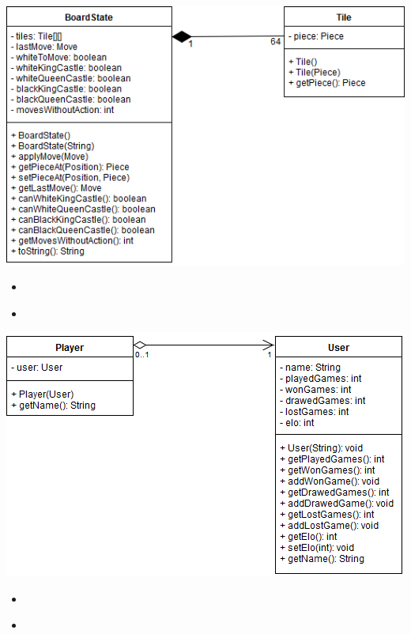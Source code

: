 \documentclass[parskip=full]{scrartcl}
\begin{document}
\begin{minipage}{\linewidth}
			\centering
			\includegraphics[width=1\linewidth]{Diagramme/BoardState}
			\label{fig:boardState}
		\end{minipage}
		\begin{itemize}
			\item
				\begin{description}
				
				\end{description}
			\item
				\begin{description}
				
				\end{description}
		\end{itemize}
		\newpage		
		
\begin{minipage}{\linewidth}
			\centering
			\includegraphics[width=1\linewidth]{Diagramme/Player}
			\label{fig:player}
		\end{minipage}
		\begin{itemize}
			\item
				\begin{description}
				
				\end{description}
			\item
				\begin{description}
				
				\end{description}
		\end{itemize}
		\newpage		
		
\end{document}

